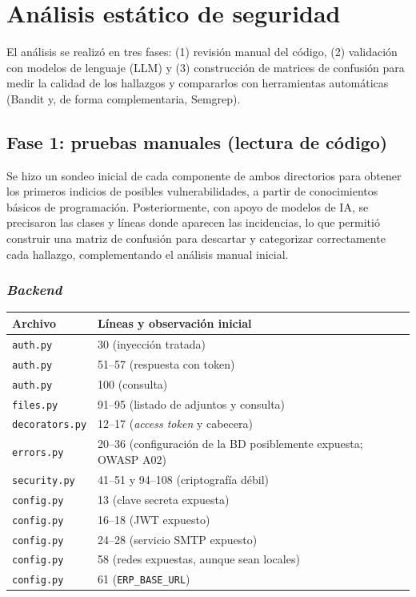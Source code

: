 \documentclass[11pt,letterpaper]{article}
\newcommand{\f}[1]{\texttt{#1}}
\newcommand{\enc}[1]{\textbf{#1}}
\begin{document}
\section{Análisis estático de seguridad}\label{sec:sast}

El análisis se realizó en tres fases: (1) revisión manual del código, (2) validación con modelos de lenguaje (LLM) y (3) construcción de matrices de confusión para medir la calidad de los hallazgos y compararlos con herramientas automáticas (Bandit y, de forma complementaria, Semgrep).

\subsection{Fase 1: pruebas manuales (lectura de código)}

Se hizo un sondeo inicial de cada componente de ambos directorios para obtener los primeros indicios de posibles vulnerabilidades, a partir de conocimientos básicos de programación. Posteriormente, con apoyo de modelos de IA, se precisaron las clases y líneas donde aparecen las incidencias, lo que permitió construir una matriz de confusión para descartar y categorizar correctamente cada hallazgo, complementando el análisis manual inicial.

\subsubsection*{\textit{Backend}}
\begin{center}
\begin{tabular}{p{4cm}p{9cm}}
\toprule
\enc{Archivo} & \enc{Líneas y observación inicial} \\
\midrule
\f{auth.py} & 30 (inyección tratada) \\
\f{auth.py} & 51--57 (respuesta con token) \\
\f{auth.py} & 100 (consulta) \\
\f{files.py} & 91--95 (listado de adjuntos y consulta) \\
\f{decorators.py} & 12--17 (\textit{access token} y cabecera) \\
\f{errors.py} & 20--36 (configuración de la BD posiblemente expuesta; OWASP A02) \\
\f{security.py} & 41--51 y 94--108 (criptografía débil) \\
\f{config.py} & 13 (clave secreta expuesta) \\
\f{config.py} & 16--18 (JWT expuesto) \\
\f{config.py} & 24--28 (servicio SMTP expuesto) \\
\f{config.py} & 58 (redes expuestas, aunque sean locales) \\
\f{config.py} & 61 (\f{ERP\_BASE\_URL}) \\
\bottomrule
\end{tabular}
\end{center}
\end{document}
